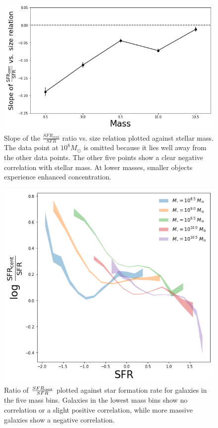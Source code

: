 \documentclass[iop]{emulateapj}
\begin{document}
\begin{figure}
	\centering
	\includegraphics[width= \columnwidth]{slope_cent_excess.png}
	\caption{Slope of the $\frac{SFR_{cent}}{SFR}$ ratio vs. size relation plotted against stellar mass. The data point at $10^{8} M_{\odot}$ is omitted because it lies well away from the other data points. The other five points show a clear negative correlation with stellar mass. At lower masses, smaller objects experience enhanced concentration.}
	\label{fig:HA_ex_mass}
	
\end{figure}

\begin{figure}
	\centering
	\includegraphics[width=1.5 \columnwidth]{excess_sfr.png}
	\caption{Ratio of $\frac{SFR_{\rm cent}}{SFR}$ plotted against star formation rate for galaxies in the five mass bins. Galaxies in the lowest mass bins show no correlation or a slight positive correlation, while more massive galaxies show a negative correlation.}
	\label{fig:dens_bin}
	
\end{figure}
\end{document}

